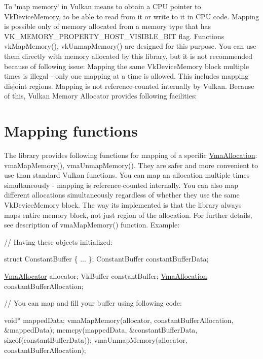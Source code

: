 To \char`\"{}map memory\char`\"{} in Vulkan means to obtain a C\+PU pointer to {\ttfamily Vk\+Device\+Memory}, to be able to read from it or write to it in C\+PU code. Mapping is possible only of memory allocated from a memory type that has {\ttfamily V\+K\+\_\+\+M\+E\+M\+O\+R\+Y\+\_\+\+P\+R\+O\+P\+E\+R\+T\+Y\+\_\+\+H\+O\+S\+T\+\_\+\+V\+I\+S\+I\+B\+L\+E\+\_\+\+B\+IT} flag. Functions {\ttfamily vk\+Map\+Memory()}, {\ttfamily vk\+Unmap\+Memory()} are designed for this purpose. You can use them directly with memory allocated by this library, but it is not recommended because of following issue\+: Mapping the same {\ttfamily Vk\+Device\+Memory} block multiple times is illegal -\/ only one mapping at a time is allowed. This includes mapping disjoint regions. Mapping is not reference-\/counted internally by Vulkan. Because of this, Vulkan Memory Allocator provides following facilities\+:\hypertarget{memory_mapping_memory_mapping_mapping_functions}{}\section{Mapping functions}\label{memory_mapping_memory_mapping_mapping_functions}
The library provides following functions for mapping of a specific \hyperlink{structVmaAllocation}{Vma\+Allocation}\+: vma\+Map\+Memory(), vma\+Unmap\+Memory(). They are safer and more convenient to use than standard Vulkan functions. You can map an allocation multiple times simultaneously -\/ mapping is reference-\/counted internally. You can also map different allocations simultaneously regardless of whether they use the same {\ttfamily Vk\+Device\+Memory} block. The way it\textquotesingle{}s implemented is that the library always maps entire memory block, not just region of the allocation. For further details, see description of vma\+Map\+Memory() function. Example\+:


\begin{DoxyCode}
\textcolor{comment}{// Having these objects initialized:}

\textcolor{keyword}{struct }ConstantBuffer
\{
    ...
\};
ConstantBuffer constantBufferData;

\hyperlink{structVmaAllocator}{VmaAllocator} allocator;
VkBuffer constantBuffer;
\hyperlink{structVmaAllocation}{VmaAllocation} constantBufferAllocation;

\textcolor{comment}{// You can map and fill your buffer using following code:}

\textcolor{keywordtype}{void}* mappedData;
vmaMapMemory(allocator, constantBufferAllocation, &mappedData);
memcpy(mappedData, &constantBufferData, \textcolor{keyword}{sizeof}(constantBufferData));
vmaUnmapMemory(allocator, constantBufferAllocation);
\end{DoxyCode}


